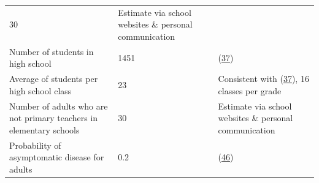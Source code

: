 \documentclass[
]{article}
\begin{document}
\begin{longtable}[]{@{}lll@{}}
\begin{minipage}[t]{0.09\columnwidth}
30\strut
\end{minipage} & \begin{minipage}[t]{0.54\columnwidth}\raggedright
Estimate via school websites \& personal communication\strut
\end{minipage}\tabularnewline
\begin{minipage}[t]{0.28\columnwidth}\raggedright
Number of students in high school\strut
\end{minipage} & \begin{minipage}[t]{0.09\columnwidth}\raggedright
1451\strut
\end{minipage} & \begin{minipage}[t]{0.54\columnwidth}\raggedright
(\protect\hyperlink{ref-noauthor_digest_nodate}{37})\strut
\end{minipage}\tabularnewline
\begin{minipage}[t]{0.28\columnwidth}\raggedright
Average of students per high school class\strut
\end{minipage} & \begin{minipage}[t]{0.09\columnwidth}\raggedright
23\strut
\end{minipage} & \begin{minipage}[t]{0.54\columnwidth}\raggedright
Consistent with (\protect\hyperlink{ref-noauthor_digest_nodate}{37}), 16
classes per grade\strut
\end{minipage}\tabularnewline
\begin{minipage}[t]{0.28\columnwidth}\raggedright
Number of adults who are not primary teachers in elementary
schools\strut
\end{minipage} & \begin{minipage}[t]{0.09\columnwidth}\raggedright
30\strut
\end{minipage} & \begin{minipage}[t]{0.54\columnwidth}\raggedright
Estimate via school websites \& personal communication\strut
\end{minipage}\tabularnewline
\begin{minipage}[t]{0.28\columnwidth}\raggedright
Probability of asymptomatic disease for adults\strut
\end{minipage} & \begin{minipage}[t]{0.09\columnwidth}\raggedright
0.2\strut
\end{minipage} & \begin{minipage}[t]{0.54\columnwidth}\raggedright
(\protect\hyperlink{ref-byambasuren_estimating_2020}{46})\strut
\end{minipage}\tabularnewline

\end{longtable}
\end{document}
